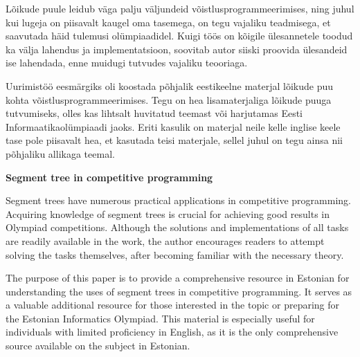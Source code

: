 \documentclass{trkut}
\theoremstyle{definition}
\begin{document}

Lõikude puule leidub väga palju väljundeid võistlusprogrammeerimises, ning juhul kui lugeja on piisavalt kaugel oma tasemega, on tegu vajaliku teadmisega, et saavutada häid tulemusi olümpiaadidel. Kuigi töös on kõigile ülesannetele toodud ka välja lahendus ja implementatsioon, soovitab autor siiski proovida ülesandeid ise lahendada, enne muidugi tutvudes vajaliku teooriaga.

Uurimistöö eesmärgiks oli koostada põhjalik eestikeelne materjal lõikude puu kohta võistlusprogrammeerimises. Tegu on hea lisamaterjaliga lõikude puuga tutvumiseks, olles kas lihtsalt huvitatud teemast või harjutamas Eesti Informaatikaolümpiaadi jaoks. Eriti kasulik on materjal neile kelle inglise keele tase pole piisavalt hea, et kasutada teisi materjale, sellel juhul on tegu ainsa nii põhjaliku allikaga teemal.


\textbf{Segment tree in competitive programming}

Segment trees have numerous practical applications in competitive programming. Acquiring knowledge of segment trees is crucial for achieving good results in Olympiad competitions. Although the solutions and implementations of all tasks are readily available in the work, the author encourages readers to attempt solving the tasks themselves, after becoming familiar with the necessary theory.

The purpose of this paper is to provide a comprehensive resource in Estonian for understanding the uses of segment trees in competitive programming. It serves as a valuable additional resource for those interested in the topic or preparing for the Estonian Informatics Olympiad. This material is especially useful for individuals with limited proficiency in English, as it is the only comprehensive source available on the subject in Estonian.

\kinnitusleht
\end{document}
